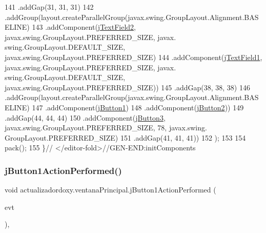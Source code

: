 \begin{DoxyCode}
141                 .addGap(31, 31, 31)
142                 .addGroup(layout.createParallelGroup(javax.swing.GroupLayout.Alignment.BASELINE)
143                     .addComponent(\mbox{\hyperlink{classactualizadordoxy_1_1ventana_principal_a8e245eb8ef04c878fffa2f029094c142}{jTextField2}}, javax.swing.GroupLayout.PREFERRED\_SIZE, javax.
      swing.GroupLayout.DEFAULT\_SIZE, javax.swing.GroupLayout.PREFERRED\_SIZE)
144                     .addComponent(\mbox{\hyperlink{classactualizadordoxy_1_1ventana_principal_a0e2df794c32f58c41675cd579e38b5d0}{jTextField1}}, javax.swing.GroupLayout.PREFERRED\_SIZE, javax.
      swing.GroupLayout.DEFAULT\_SIZE, javax.swing.GroupLayout.PREFERRED\_SIZE))
145                 .addGap(38, 38, 38)
146                 .addGroup(layout.createParallelGroup(javax.swing.GroupLayout.Alignment.BASELINE)
147                     .addComponent(\mbox{\hyperlink{classactualizadordoxy_1_1ventana_principal_a9e234f123e4d11dcd43f19051065a6bd}{jButton1}})
148                     .addComponent(\mbox{\hyperlink{classactualizadordoxy_1_1ventana_principal_a2cf13d88ffb8e10bbc41bf5d690bd6fe}{jButton2}}))
149                 .addGap(44, 44, 44)
150                 .addComponent(\mbox{\hyperlink{classactualizadordoxy_1_1ventana_principal_a228eef1536949c06fd4cfef1fe9b97b8}{jButton3}}, javax.swing.GroupLayout.PREFERRED\_SIZE, 78, javax.swing.
      GroupLayout.PREFERRED\_SIZE)
151                 .addGap(41, 41, 41))
152         );
153 
154         pack();
155     \}\textcolor{comment}{// </editor-fold>//GEN-END:initComponents}
\end{DoxyCode}
\mbox{\label{classactualizadordoxy_1_1ventana_principal_aa309a47bf4e80a45c18c516ec13f8c64}} 
\subsubsection{\texorpdfstring{j\+Button1\+Action\+Performed()}{jButton1ActionPerformed()}}
{\footnotesize\ttfamily void actualizadordoxy.\+ventana\+Principal.\+j\+Button1\+Action\+Performed (\begin{DoxyParamCaption}\item[{java.\+awt.\+event.\+Action\+Event}]{evt }\end{DoxyParamCaption})\hspace{0.3cm}{\ttfamily [inline]}, {\ttfamily [private]}}


